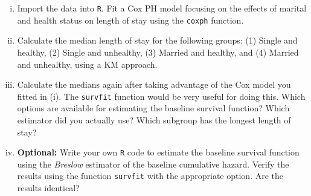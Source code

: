\begin{enumerate}[(a)]
\begin{enumerate}[(i)]
\item Import the data into \verb|R|. Fit a Cox PH model focusing on the effects of marital and health status on length of stay using the \verb|coxph| function.
\item Calculate the median length of stay for the following groups: (1) Single and healthy, (2) Single and unhealthy, (3) Married and healthy, and (4) Married and unhealthy, using a KM approach.
\item Calculate the medians again after taking advantage of the Cox model you fitted in (i). The \verb|survfit| function would be very useful for doing this. Which options are available for estimating the baseline survival function? Which estimator did you actually use? Which subgroup has the longest length of stay?
\item \textbf{Optional:} Write your own \verb|R| code to estimate the baseline survival function using the \emph{Breslow} estimator of the baseline cumulative hazard. Verify the results using the function \verb|survfit| with the appropriate option. Are the results identical? 
\end{enumerate}
\end{enumerate}